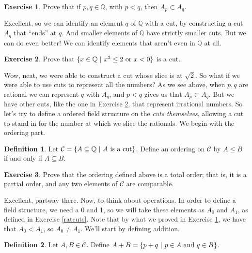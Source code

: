 \documentclass{article}
\theoremstyle{definition}
\newtheorem{definition}{Definition}
\newtheorem{exercise}{Exercise}
\newcommand{\Q}{\mathbb{Q}}
\begin{document}
\begin{exercise}\label{ratorder}
Prove that if $p, q\in \Q$, with $p< q$, then $A_p\subset A_q$.
\end{exercise}

Excellent, so we can identify an element $q$ of $\Q$ with a cut, by constructing a cut $A_q$ that ``ends'' at $q$. And smaller elements of $\Q$ have strictly smaller cuts. But we can do even better! We can identify elements that aren't even in $\Q$ at all. 

\begin{exercise}\label{sqrtcut}
Prove that $\{x\in \Q\ | \ x^2\leq 2\hbox{ or } x<0\}$ is a cut.
\end{exercise}

Wow, neat, we were able to construct a cut whose slice is at $\sqrt{2}$. So what if we were able to use cuts to represent all the numbers? As we see above, when $p, q$ are rational we can represent $q$ with $A_q$, and $p<q$ gives us that $A_p\subset A_q$. But we have other cuts, like the one in Exercise \ref{sqrtcut}, that represent irrational numbers. So let's try to define a ordered field structure on the {\it cuts themselves}, allowing a cut to stand in for the number at which we slice the rationals. We begin with the ordering part.

\begin{definition}
Let $\mathcal{C} = \{A\subseteq \Q\ | \ A\hbox{ is a cut}\}$. Define an ordering on $\mathcal{C}$ by $A\leq B$ if and only if $A\subseteq B$.
\end{definition}

\begin{exercise}
Prove that the ordering defined above is a total order; that is, it is a partial order, and any two elements of $\mathcal{C}$ are comparable.
\end{exercise}

Excellent, partway there. Now, to think about operations. In order to define a field structure, we need a 0 and 1, so we will take these elements as $A_0$ and $A_1$, as defined in Exercise \ref{ratcuts}. Note that by what we proved in Exercise \ref{ratorder}, we have that $A_0<A_1$, so $A_0\neq A_1$. We'll start by defining addition.

\begin{definition}
Let $A, B\in \mathcal{C}$. Define $A+B = \{p+q\ | \ p\in A\hbox{ and }q\in B\}$.
\end{definition}
\end{document}
